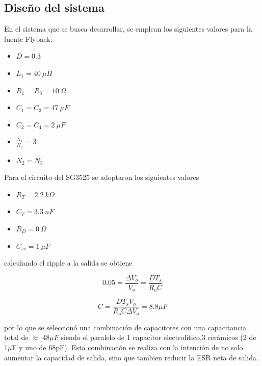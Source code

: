 %
%
%

\subsection{Diseño del sistema}

En el sistema que se busca desarrollar, se emplean los siguientes valores para la fuente Flyback:
\begin{multicols}{2}
\begin{itemize}
	\item $D = 0.3$
	\item $L_1 = 40 \ \mu H$
	\item $R_1 = R_3 = 10 \ \Omega$
	\item $C_1 = C_3 = 47 \ \mu F$
	\item $C_2 = C_4 = 2 \ \mu F$
	\item $\frac{N_1}{N_2} = 3 $
	\item $N_2 = N_3 $
\end{itemize}
\end{multicols}

Para el circuito del SG3525 se adoptaron los siguientes valores
\begin{multicols}{2}
\begin{itemize}
	\item $R_T = 2.2  \ k\Omega$
	\item $C_T = 3.3 \ n F$
	\item $R_D = 0 \ \Omega$
	\item $C_{ss} = 1 \ \mu F$
\end{itemize}
\end{multicols}

calculando el ripple a la salida se obtiene

\begin{equation}
0.05 = \frac{\Delta V_o}{V_o} = \frac{DT_s}{R_oC}
\end{equation}

\begin{equation}
C = \frac{DT_sV_o}{R_oC\Delta V_o} = 8.8 \mu F

\end{equation}

por lo que se seleccionó una combinación de capacitores con una capacitancia total de $\approx$ 48$\mu F$ siendo el paralelo de 1 capacitor electrolítico,3 cerámicos (2 de 1$\mu$F y uno de 68pF). Esta combinación se realiza con la intención de no solo aumentar la capacidad de salida, sino que tambien reducir la ESR neta de salida.  


